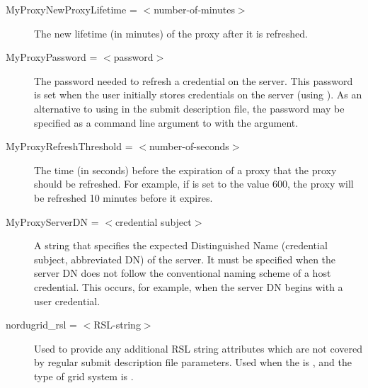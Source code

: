 \begin{description}
\label{condor-submit-MyProxyLifetime}
\item[MyProxyNewProxyLifetime = $<$number-of-minutes$>$]
The new lifetime (in minutes) of the proxy after it is refreshed.


\label{condor-submit-MyProxyPassword}
\item[MyProxyPassword = $<$password$>$]
The password needed to refresh a credential on the  server.
This password is set when the user initially stores
credentials on the server (using ).
As an alternative to using  in the
submit description file,
the password may be specified as a command line argument to 
with the  argument.


\label{condor-submit-MyProxyThreshhold}
\item[MyProxyRefreshThreshold = $<$number-of-seconds$>$]
The time (in seconds) before the expiration of a proxy 
that the proxy should be refreshed.
For example, if  is set to the
value 600, the proxy will be refreshed 10 minutes before
it expires.


\label{condor-submit-MyProxyServerDN}
\item[MyProxyServerDN = $<$credential subject$>$]
A string that specifies the expected Distinguished Name (credential subject,
abbreviated DN)
of the  server.
It must be specified when the  server
DN does not follow the
conventional naming scheme of a host credential.
This occurs, for
example, when the   server DN begins with a user credential.



\label{condor-submit-nordugrid-rsl}
\item[nordugrid\_rsl = $<$RSL-string$>$]
Used to provide any additional RSL
string attributes which are not covered by regular submit description
file parameters. Used when the  is ,
and the type of grid system is .



\end{description}
